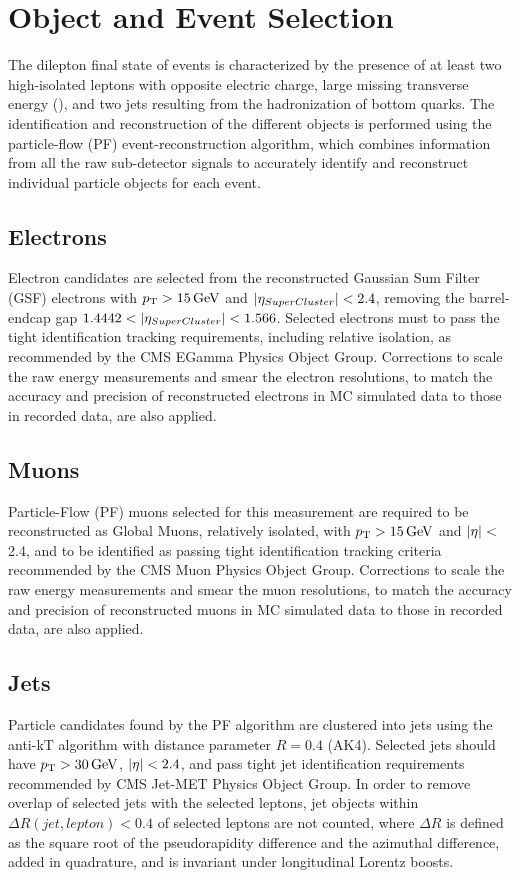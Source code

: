 \section{Object and Event Selection}
The dilepton final state of \ttbar events is characterized by the presence of at least two high-\pT isolated leptons with opposite electric charge, large missing transverse energy (\MET), and two jets resulting from the hadronization of bottom quarks.
The identification and reconstruction of the different objects is performed using the particle-flow (PF) event-reconstruction algorithm, which combines information from all the raw sub-detector signals to accurately identify and reconstruct individual particle objects for each event. 
\subsection{Electrons}
Electron candidates are selected from the reconstructed Gaussian Sum Filter (GSF) electrons with $\pT > \SI{15}{\GeV}$ and $\left\vert\eta_{SuperCluster}\right\vert< 2.4$, removing the barrel-endcap gap $1.4442 < \left\vert\eta_{SuperCluster}\right\vert< 1.566$. 
Selected electrons must to pass the tight identification tracking requirements, including relative isolation, as recommended by the CMS EGamma Physics Object Group.
Corrections to scale the raw energy measurements and smear the electron resolutions, to match the accuracy and precision of reconstructed electrons in MC simulated data to those in recorded data, are also applied.
\subsection{Muons}
Particle-Flow (PF) muons selected for this measurement are required to be reconstructed as Global Muons, relatively isolated, with $\pT > \SI{15}{\GeV}$ and $\left\vert\eta\right\vert<$ 2.4, and to be identified as passing tight identification tracking criteria recommended by the CMS Muon Physics Object Group.
Corrections to scale the raw energy measurements and smear the muon resolutions, to match the accuracy and precision of reconstructed muons in MC simulated data to those in recorded data, are also applied.
\subsection{Jets}
Particle candidates found by the PF algorithm are clustered into jets using the anti-kT algorithm with distance parameter $R = 0.4$ (AK4). 
Selected jets should have $\pT > \SI{30}{\GeV}$, $\left\vert\eta\right\vert <2.4$, and pass tight jet identification requirements recommended by CMS Jet-MET Physics Object Group.
In order to remove overlap of selected jets with the selected leptons, jet objects within $\Delta R(jet,lepton) < 0.4$ of selected leptons are not counted, where $\Delta R$ is defined as the square root of the pseudorapidity difference and the azimuthal difference, added in quadrature, and is invariant under longitudinal Lorentz boosts.
